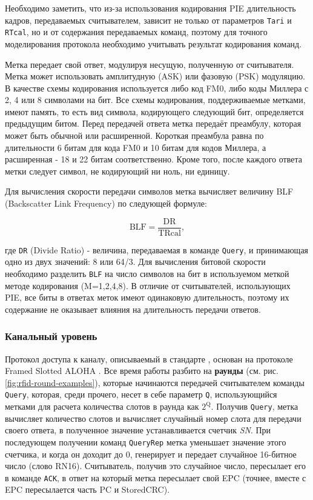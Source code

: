 Необходимо заметить, что из-за использования кодирования PIE длительность кадров, передаваемых считывателем, зависит не только от параметров \texttt{Tari} и \texttt{RTcal}, но и от содержания передаваемых команд, поэтому для точного моделирования протокола необходимо учитывать результат кодирования команд.

Метка передает свой ответ, модулируя несущую, полученную от считывателя. Метка может использовать амплитудную (ASK) или фазовую (PSK) модуляцию. В качестве схемы кодирования используется либо код FM0, либо коды Миллера с 2, 4 или 8 символами на бит. Все схемы кодирования, поддерживаемые метками, имеют память, то есть вид символа, кодирующего следующий бит, определяется предыдущим битом. Перед передачей ответа метка передаёт преамбулу, которая может быть обычной или расширенной. Короткая преамбула равна по длительности 6 битам для кода FM0 и 10 битам для кодов Миллера, а расширенная - 18 и 22 битам соответственно. Кроме того, после каждого ответа метки следует символ, не кодирующий ни ноль, ни единицу.

Для вычисления скорости передачи символов метка вычисляет величину BLF (Backscatter Link Frequency) по следующей формуле:

$$
\text{BLF} = \frac{\text{DR}}{\text{TRcal}},
$$

где \texttt{DR} (Divide Ratio) - величина, передаваемая в команде \texttt{Query}, и принимающая одно из двух значений: 8 или 64/3. Для вычисления битовой скорости необходимо разделить \texttt{BLF} на число символов на бит в используемом меткой методе кодирования (M=1,2,4,8). В отличие от считывателей, использующих PIE, все биты в ответах меток имеют одинаковую длительность, поэтому их содержание не оказывает влияния на длительность передачи ответов.




\subsubsection{Канальный уровень}

Протокол доступа к каналу, описываемый в стандарте \cite{std_gen2}, основан на протоколе Framed Slotted ALOHA \cite{Roberts1975, Abramson1970}. Все время работы разбито на \textbf{раунды} (см. рис. \ref{fig:rfid-round-examples}), которые начинаются передачей считывателем команды \texttt{Query}, которая, среди прочего, несет в себе параметр \texttt{Q}, использующийся метками для расчета количества слотов в раунда как $2^\text{Q}$. Получив \texttt{Query}, метка вычисляет количество слотов и вычисляет случайный номер слота для передачи своего ответа, в полученное значение устанавливается счетчик \textit{SN}. При последующем получении команд \texttt{QueryRep} метка уменьшает значение этого счетчика, и когда он доходит до 0, генерирует и передает случайное 16-битное число (слово RN16). Считыватель, получив это случайное число, пересылает его в команде \texttt{ACK}, в ответ на который метка пересылает свой EPC (точнее, вместе с EPC пересылается часть PC и StoredCRC).

